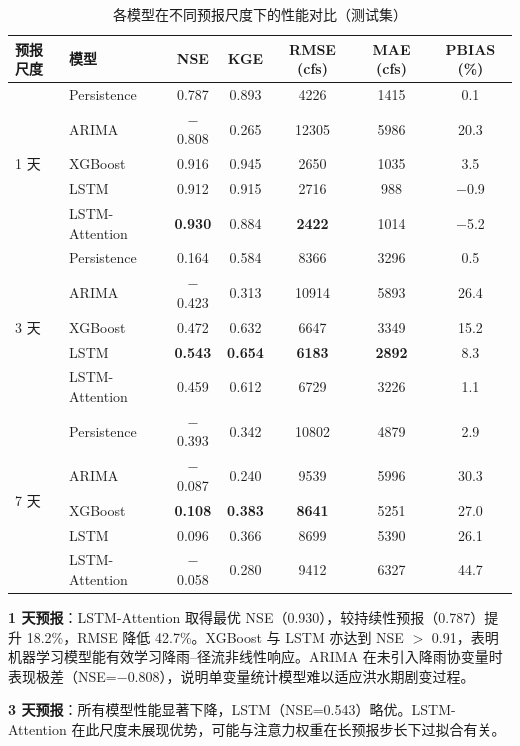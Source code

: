 \documentclass[12pt,a4paper]{article}
\begin{document}
\begin{table}[htbp]
\centering
\caption{各模型在不同预报尺度下的性能对比（测试集）}
\label{tab:metrics}
\begin{tabular}{llccccc}
\toprule
预报尺度 & 模型 & NSE & KGE & RMSE (cfs) & MAE (cfs) & PBIAS (\%) \\
\midrule
\multirow{5}{*}{1 天} 
  & Persistence & 0.787 & 0.893 & 4226 & 1415 & 0.1 \\
  & ARIMA       & $-$0.808 & 0.265 & 12305 & 5986 & 20.3 \\
  & XGBoost     & 0.916 & 0.945 & 2650 & 1035 & 3.5 \\
  & LSTM        & 0.912 & 0.915 & 2716 & 988 & $-$0.9 \\
  & LSTM-Attention & \textbf{0.930} & 0.884 & \textbf{2422} & 1014 & $-$5.2 \\
\midrule
\multirow{5}{*}{3 天}
  & Persistence & 0.164 & 0.584 & 8366 & 3296 & 0.5 \\
  & ARIMA       & $-$0.423 & 0.313 & 10914 & 5893 & 26.4 \\
  & XGBoost     & 0.472 & 0.632 & 6647 & 3349 & 15.2 \\
  & LSTM        & \textbf{0.543} & \textbf{0.654} & \textbf{6183} & \textbf{2892} & 8.3 \\
  & LSTM-Attention & 0.459 & 0.612 & 6729 & 3226 & 1.1 \\
\midrule
\multirow{5}{*}{7 天}
  & Persistence & $-$0.393 & 0.342 & 10802 & 4879 & 2.9 \\
  & ARIMA       & $-$0.087 & 0.240 & 9539 & 5996 & 30.3 \\
  & XGBoost     & \textbf{0.108} & \textbf{0.383} & \textbf{8641} & 5251 & 27.0 \\
  & LSTM        & 0.096 & 0.366 & 8699 & 5390 & 26.1 \\
  & LSTM-Attention & $-$0.058 & 0.280 & 9412 & 6327 & 44.7 \\
\bottomrule
\end{tabular}
\end{table}

\textbf{1 天预报}：LSTM-Attention 取得最优 NSE（0.930），较持续性预报（0.787）提升 18.2\%，RMSE 降低 42.7\%。XGBoost 与 LSTM 亦达到 NSE $>$ 0.91，表明机器学习模型能有效学习降雨--径流非线性响应。ARIMA 在未引入降雨协变量时表现极差（NSE=$-$0.808），说明单变量统计模型难以适应洪水期剧变过程。

\textbf{3 天预报}：所有模型性能显著下降，LSTM（NSE=0.543）略优。LSTM-Attention 在此尺度未展现优势，可能与注意力权重在长预报步长下过拟合有关。
\end{document}
